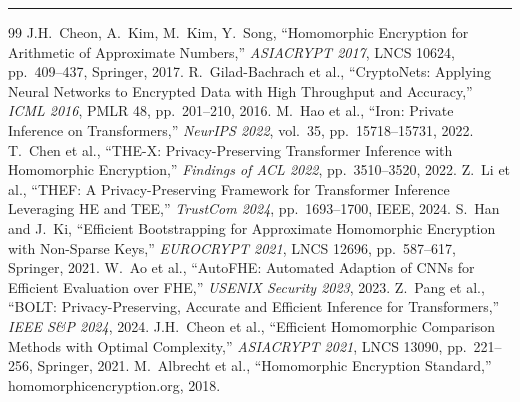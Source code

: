 \documentclass[12pt, a4paper]{article}
\begin{document}
\vspace{0.5em}

\medskip
\noindent\rule{\textwidth}{0.5pt}
{\footnotesize
\begin{thebibliography}{99}
 J.H.\ Cheon, A.\ Kim, M.\ Kim, Y.\ Song, ``Homomorphic Encryption for Arithmetic of Approximate Numbers,'' \textit{ASIACRYPT 2017}, LNCS 10624, pp.\ 409--437, Springer, 2017.
 R.\ Gilad-Bachrach et al., ``CryptoNets: Applying Neural Networks to Encrypted Data with High Throughput and Accuracy,'' \textit{ICML 2016}, PMLR 48, pp.\ 201--210, 2016.
 M.\ Hao et al., ``Iron: Private Inference on Transformers,'' \textit{NeurIPS 2022}, vol.\ 35, pp.\ 15718--15731, 2022.
 T.\ Chen et al., ``THE-X: Privacy-Preserving Transformer Inference with Homomorphic Encryption,'' \textit{Findings of ACL 2022}, pp.\ 3510--3520, 2022.
 Z.\ Li et al., ``THEF: A Privacy-Preserving Framework for Transformer Inference Leveraging HE and TEE,'' \textit{TrustCom 2024}, pp.\ 1693--1700, IEEE, 2024.
 S.\ Han and J.\ Ki, ``Efficient Bootstrapping for Approximate Homomorphic Encryption with Non-Sparse Keys,'' \textit{EUROCRYPT 2021}, LNCS 12696, pp.\ 587--617, Springer, 2021.
 W.\ Ao et al., ``AutoFHE: Automated Adaption of CNNs for Efficient Evaluation over FHE,'' \textit{USENIX Security 2023}, 2023.
 Z.\ Pang et al., ``BOLT: Privacy-Preserving, Accurate and Efficient Inference for Transformers,'' \textit{IEEE S\&P 2024}, 2024.
 J.H.\ Cheon et al., ``Efficient Homomorphic Comparison Methods with Optimal Complexity,'' \textit{ASIACRYPT 2021}, LNCS 13090, pp.\ 221--256, Springer, 2021.
 M.\ Albrecht et al., ``Homomorphic Encryption Standard,'' homomorphicencryption.org, 2018.
\end{thebibliography}
}
\end{document}

